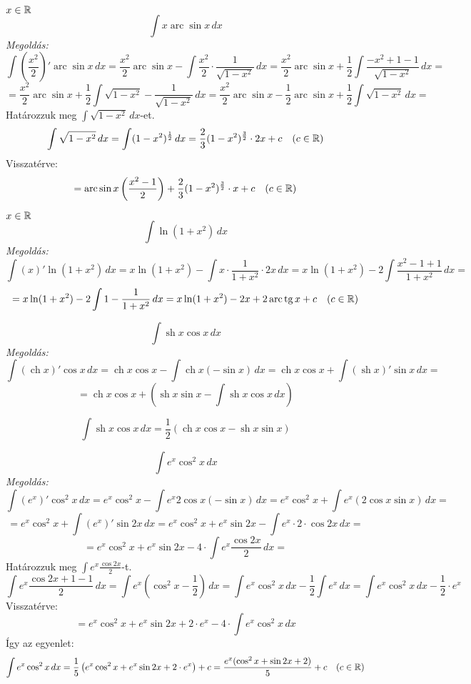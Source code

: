 \documentclass[a4paper,11.5pt]{article}
\DeclareMathOperator{\tg}{tg}
\DeclareMathOperator{\sh}{sh}
\DeclareMathOperator{\ch}{ch}
\DeclareMathOperator{\arc}{arc}
\begin{document}
	\begin{exercise}
		$x\in\mathbb{R}$
		\[ \int x\arc\sin x\,dx \]
		\textit{Megoldás:}
		\[ \int\left(\frac{x^2}{2}\right)'\arc\sin x\,dx=\frac{x^2}{2}\arc\sin x-\int\frac{x^2}{2}\cdot\frac{1}{\sqrt{1-x^2}}\,dx=\frac{x^2}{2}\arc\sin x + \frac{1}{2}\int\frac{-x^2+1-1}{\sqrt{1-x^2}}\,dx= \]
		\[ =\frac{x^2}{2}\arc\sin x+ \frac{1}{2}\int\sqrt{1-x^2}-\frac{1}{\sqrt{1-x^2}}\,dx=\frac{x^2}{2}\arc\sin x-\frac{1}{2}\arc\sin x+\frac{1}{2}\int\sqrt{1-x^2}\,dx=\]
		Határozzuk meg $\int\sqrt{1-x^2}\,dx$-et.
		\[ \int\sqrt{1-x^2}\,dx=\int (1-x^2)^{\frac{1}{2}}\,dx=\frac{2}{3}(1-x^2)^{\frac{3}{2}}\cdot 2x + c\quad (c\in\mathbb{R}) \]
		Visszatérve:
		\[ =\arc\sin x\left(\frac{x^2-1}{2}\right)+\frac{2}{3}(1-x^2)^{\frac{3}{2}}\cdot x + c\quad (c\in\R) \]
	\end{exercise}
	\begin{exercise}
		$x\in\mathbb{R}$
		\[ \int\ln(1+x^2)\,dx\]
		\textit{Megoldás:}
		\[\int(x)'\ln(1+x^2)\,dx=x\ln(1+x^2)-\int x\cdot\frac{1}{1+x^2}\cdot 2x\,dx=x\ln(1+x^2)-2\int\frac{x^2-1+1}{1+x^2}\,dx= \]
		\[ =x\ln(1+x^2)-2\int1-\frac{1}{1+x^2}\,dx=x\ln(1+x^2)-2x+2\arc\tg x + c\quad (c\in\R) \]
	\end{exercise}
	\begin{exercise}
		\[ \int \sh x\cos x\,dx \]
		\textit{Megoldás:}
		\[ \int(\ch x)'\cos x\,dx=\ch x\cos x-\int\ch x(-\sin x)\,dx=\ch x\cos x +\int(\sh x)'\sin x\,dx=\]
		\[=\ch x\cos x+\left(\sh x\sin x-\int\sh x\cos x\,dx\right)\]
		
		\[\int \sh x\cos x\,dx=\frac{1}{2}\left(\ch x\cos x-\sh x\sin x\right) \]
	\end{exercise}
	\begin{exercise}
		\[ \int e^x\cos^2x\,dx \]
		\textit{Megoldás:}
		\[ \int (e^x)'\cos^2x\,dx=e^x\cos^2x-\int e^x2\cos x(-\sin x)\,dx=e^x\cos^2x+\int e^x(2\cos x\sin x)\,dx=\]
		\[=e^x\cos^2x+\int (e^x)'\sin2x\,dx=e^x\cos^2x+e^x\sin2x-\int e^x\cdot2\cdot\cos2x\,dx=\]
		\[ =e^x\cos^2x+e^x\sin2x-4\cdot\int e^x\frac{\cos2x}{2}\,dx= \]
		Határozzuk meg $\int e^x\frac{\cos2x}{2}$-t.
		\[\int e^x\frac{\cos2x+1-1}{2}\,dx=\int e^x\left(\cos^2x-\frac{1}{2}\right)\,dx=\int e^x\cos^2x\,dx-\frac{1}{2}\int e^x\,dx=\int e^x\cos^2x\,dx-\frac{1}{2}\cdot e^x  \]
		Visszatérve:
		\[ =e^x\cos^2x+e^x\sin2x+2\cdot e^x-4\cdot\int e^x\cos^2x\,dx \]
		Így az egyenlet:
		\[ \int e^x\cos^2x\,dx=\frac{1}{5}\left(e^x\cos^2x+e^x\sin2x+2\cdot e^x \right)+c=\frac{e^x(\cos^2x+\sin2x+2)}{5}+c\quad (c\in\mathbb{R}) \]
	\end{exercise}
\end{document}
